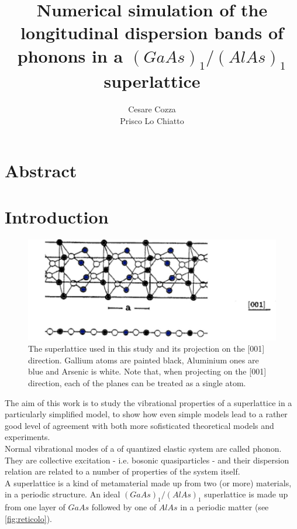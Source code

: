 \documentclass{article}
\begin{document}
 
	
	\author{Cesare Cozza \\ Prisco Lo Chiatto }
	\title{Numerical simulation of the longitudinal dispersion bands of phonons in a $(GaAs)_1/(AlAs)_1$ superlattice}
	\maketitle
    \newpage
    
    
\section{Abstract}




\section{Introduction}
\begin{figure}
	\centering
	\includegraphics[scale=0.3]{reticolo.jpg}
	\caption{The superlattice used in this study and its projection on the [001] direction. Gallium atoms are painted black, Aluminium ones are blue and Arsenic is white. Note that, when projecting on the [001] direction, each of the planes can be treated as a single atom.}
	\label{fig:reticolo}
\end{figure}

The aim of this work is to study the vibrational properties of a superlattice in a particularly simplified model, to show how even simple models lead to a rather good level of agreement with both more sofisticated theoretical models and experiments.\\
Normal vibrational modes of a of quantized elastic system are called phonon. They are collective excitation - i.e. bosonic quasiparticles - and their dispersion relation are related to a number of properties of the system itself. \\
A superlattice is a kind of metamaterial made up from two (or more) materials, in a periodic structure. An ideal $(GaAs)_1/(AlAs)_1$ superlattice is made up from one layer of $GaAs$ followed by one of $AlAs$ in a periodic matter (see \autoref{fig:reticolo}).\smallskip
\end{document}
